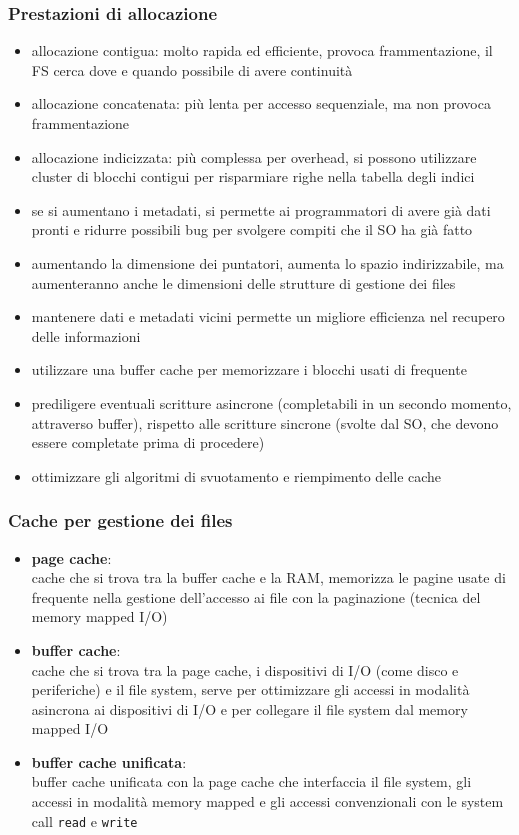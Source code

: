 \documentclass[a4paper]{article}
\begin{document}
\subsubsection*{Prestazioni di allocazione}
\begin{itemize}
	\item allocazione contigua: molto rapida ed efficiente, provoca frammentazione, il FS cerca dove e quando possibile di avere
	continuità
	\item allocazione concatenata: più lenta per accesso sequenziale, ma non provoca frammentazione
	\item allocazione indicizzata: più complessa per overhead, si possono utilizzare cluster di blocchi contigui per risparmiare
	righe nella tabella degli indici
	\item se si aumentano i metadati, si permette ai programmatori di avere già dati pronti e ridurre possibili bug per svolgere
	compiti che il SO ha già fatto
	\item aumentando la dimensione dei puntatori, aumenta lo spazio indirizzabile, ma aumenteranno anche le dimensioni delle
	strutture di gestione dei files
	\item mantenere dati e metadati vicini permette un migliore efficienza nel recupero delle informazioni
	\item utilizzare una buffer cache per memorizzare i blocchi usati di frequente
	\item prediligere eventuali scritture asincrone (completabili in un secondo momento, attraverso buffer), rispetto alle scritture
	sincrone (svolte dal SO, che devono essere completate prima di procedere)
	\item ottimizzare gli algoritmi di svuotamento e riempimento delle cache
\end{itemize}

\subsubsection*{Cache per gestione dei files}
\begin{itemize}
	\item \textbf{page cache}: \\
	cache che si trova tra la buffer cache e la RAM, memorizza le pagine usate di frequente nella gestione dell'accesso ai file
	con la paginazione (tecnica del memory mapped I/O)

	\item \textbf{buffer cache}: \\
	cache che si trova tra la page cache, i dispositivi di I/O (come disco e periferiche) e il file system, serve per ottimizzare
	gli accessi in modalità asincrona ai dispositivi di I/O e per collegare il file system dal memory mapped I/O

	\item \textbf{buffer cache unificata}: \\
	buffer cache unificata con la page cache che interfaccia il file system, gli accessi in modalità memory mapped e gli accessi
	convenzionali con le system call \verb|read| e \verb|write|
\end{itemize}
\end{document}
